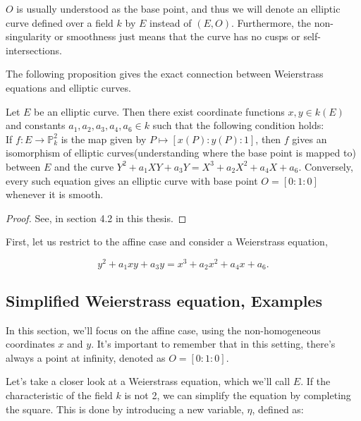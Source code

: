  \begin{remark}
   $O$ is usually understood as the base point, and thus we will denote an elliptic curve defined over a field $k$ by $E$  instead of $(E, O)$. Furthermore, the non-singularity or smoothness just means that the curve has no cusps or self-intersections.
 \end{remark} 

 The following proposition gives the exact connection between Weierstrass equations and elliptic curves. 
 
\begin{proposition}\label{1.1.5}
    Let $E$ be an elliptic curve. Then there exist coordinate functions $x, y \in k(E)$ and constants $a_{1}, a_{2}, a_{3}, a_{4}, a_{6} \in k$ such that the following condition holds: \\
    If $f: E \rightarrow \mathbb{P}^{2}_k$ is the map given by $P \mapsto[x(P): y(P): 1]$, then $f$ gives an isomorphism of elliptic curves(understanding where the base point is mapped to) between $E$ and the curve $Y^{2}+a_{1} X Y+a_{3} Y=X^{3}+a_{2} X^{2}+a_{4} X+a_{6}$. Conversely, every such equation gives an elliptic curve with base point $O=[0:1:0]$ whenever it is smooth.
\end{proposition}
\begin{proof}
    See, in section 4.2 in this thesis.
\end{proof}

First, let us restrict to the affine case and consider a Weierstrass equation, 

\begin{equation}
    y^2 + a_1xy + a_3y = x^3 + a_2x^2 + a_4x + a_6.
\end{equation}


\subsection{Simplified Weierstrass equation, Examples}

In this section, we'll focus on the affine case, using the non-homogeneous coordinates \( x \) and \( y \). It's important to remember that in this setting, there's always a point at infinity, denoted as \( O=[0:1:0] \).

Let's take a closer look at a Weierstrass equation, which we'll call \( E \). If the characteristic of the field \( k \) is not 2, we can simplify the equation by completing the square. This is done by introducing a new variable, \( \eta \), defined as:

